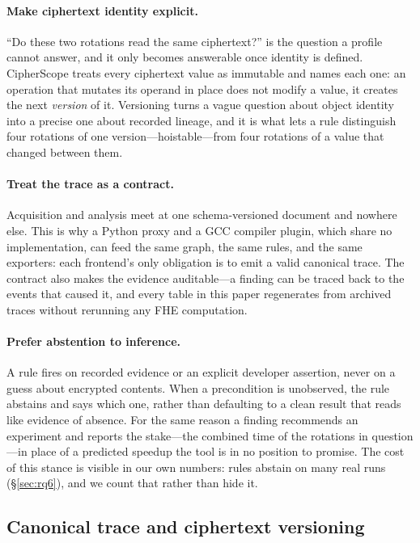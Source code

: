 \documentclass[sigconf,nonacm]{acmart}
\begin{document}
\paragraph{Make ciphertext identity explicit.} ``Do these two rotations read
the same ciphertext?'' is the question a profile cannot answer, and it only
becomes answerable once identity is defined. CipherScope treats every
ciphertext value as immutable and names each one: an operation that mutates
its operand in place does not modify a value, it creates the next
\emph{version} of it. Versioning turns a vague question about object
identity into a precise one about recorded lineage, and it is what lets a
rule distinguish four rotations of one version---hoistable---from four
rotations of a value that changed between them.

\paragraph{Treat the trace as a contract.} Acquisition and analysis meet at
one schema-versioned document and nowhere else. This is why a Python proxy
and a GCC compiler plugin, which share no implementation, can feed the same
graph, the same rules, and the same exporters: each frontend's only
obligation is to emit a valid canonical trace. The contract also makes the
evidence auditable---a finding can be traced back to the events that caused
it, and every table in this paper regenerates from archived traces without
rerunning any FHE computation.

\paragraph{Prefer abstention to inference.} A rule fires on recorded
evidence or an explicit developer assertion, never on a guess about
encrypted contents. When a precondition is unobserved, the rule abstains and
says which one, rather than defaulting to a clean result that reads like
evidence of absence. For the same reason a finding recommends an experiment
and reports the stake---the combined time of the rotations in question---in
place of a predicted speedup the tool is in no position to promise. The
cost of this stance is visible in our own numbers: rules abstain on many
real runs (\S\ref{sec:rq6}), and we count that rather than hide it.

\subsection{Canonical trace and ciphertext versioning}
\label{sec:trace}
\end{document}
